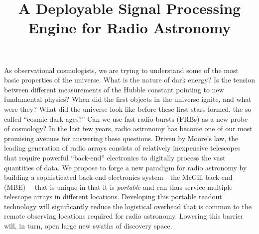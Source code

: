 \documentclass[letterpaper,11pt,preprint]{aastex}
\makeatletter
\newcommand{\mbe}{{\rm MBE}}
\def\section{\@startsection {section}{1}{\z@}{1.0ex plus 
1ex minus .2ex}{.2ex plus .2ex}{\large\bf}}
\makeatother
\begin{document}
\title{\bf A Deployable Signal Processing Engine for Radio Astronomy}


\singlespace





As observational cosmologists, we are trying to understand some of the
most basic properties of the universe.  What is the nature of dark
energy?  Is the tension between different measurements of the Hubble
constant pointing to new fundamental physics?  When did the first
objects in the universe ignite, and what were they?  What did the
universe look like before these first stars formed, the so-called
``cosmic dark ages?''  Can we use fast radio bursts (FRBs) as a new
probe of cosmology?  In the last few years, radio astronomy has become
one of our most promising avenues for answering these questions.
Driven by Moore's law, {\color{red} the leading generation of radio
  arrays consists of relatively inexpensive telescopes that require
  powerful ``back-end'' electronics to digitally process the vast
  quantities of data. We propose to forge a new paradigm for radio
  astronomy by building a sophisticated back-end electronics
  system---the McGill back-end (\mbe)--- that is unique in that it is
  {\it portable} and can thus service multiple telescope arrays in
  different locations.  Developing this portable readout technology
  will significantly reduce the logistical overhead that is common to
  the remote observing locations required for radio
  astronomy. Lowering this barrier will, in turn, open large new
  swaths of discovery space.}
\end{document}
